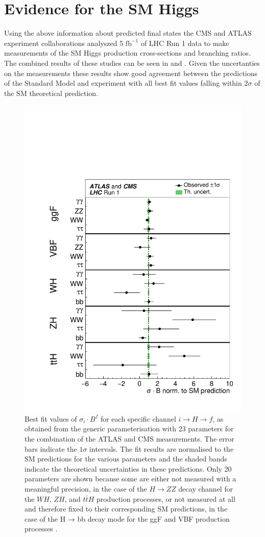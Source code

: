 \section{Evidence for the SM Higgs} \label{sec:higgs:higgs_evidence}

Using the above information about predicted final states the CMS and ATLAS
experiment collaborations analyszed 5 $\text{fb}^{-1}$ of LHC Run 1 data 
\cite{Khachatryan:2016vau} to make measurements of the SM Higgs production 
cross-sections and branching ratios.  The combined results of these studies 
can be seen in  
 and .  
Given the uncertanties on the measurements these results show good agreement 
between the predictions of the Standard Model and experiment with all best 
fit values falling within $2\sigma$ of the SM theoretical prediction.

\begin{figure}[!htbp]
  \begin{center}
    \includegraphics[width=0.5\linewidth]{figures/higgs/higgs_production_measurement.pdf}
    \caption{ Best fit values of $\sigma_{i} \cdot B^{f}$ for each specific channel $i \rightarrow H \rightarrow f$, as obtained from the generic parameterisation with 23 parameters for the combination of the ATLAS and CMS measurements. The error bars indicate the $1\sigma$ intervals. The fit results are normalised to the SM predictions for the various parameters and the shaded bands indicate the theoretical uncertainties in these predictions. Only 20 parameters are shown because some are either not measured with a meaningful precision, in the case of the $H \rightarrow ZZ$ decay channel for the $WH$, $ZH$, and $t\bar{t}H$ production processes, or not measured at all and therefore fixed to their corresponding SM predictions, in the case of the H → bb decay mode for the ggF and VBF production processes \cite{Khachatryan:2016vau}.}
    \label{fig:higgs_production_measurement}
  \end{center}
\end{figure}

